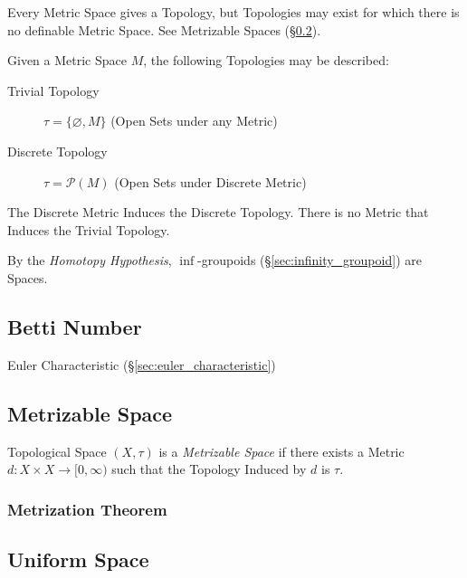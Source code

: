 Every Metric Space gives a Topology, but Topologies may exist for
which there is no definable Metric Space. See Metrizable Spaces
(\S\ref{sec:metrizable_space}).

Given a Metric Space $M$, the following Topologies may be described:
\begin{description}
\item[Trivial Topology] $\tau = \{\varnothing, M\}$ (Open Sets under
  any Metric)

\item[Discrete Topology] $\tau = \mathcal{P}(M)$ (Open Sets under
  Discrete Metric)
\end{description}
The Discrete Metric Induces the Discrete Topology. There is no Metric
that Induces the Trivial Topology.

By the \emph{Homotopy Hypothesis}, $\inf$-groupoids
(\S\ref{sec:infinity_groupoid}) are Spaces.



\subsection{Betti Number}\label{sec:betti_number}

Euler Characteristic (\S\ref{sec:euler_characteristic})



\subsection{Metrizable Space}\label{sec:metrizable_space}

Topological Space $(X, \tau)$ is a \emph{Metrizable Space} if there
exists a Metric $d : X \times X \rightarrow [0, \infty)$ such that the
  Topology Induced by $d$ is $\tau$.



\subsubsection{Metrization Theorem}\label{sec:metrization_theorem}



\subsection{Uniform Space}\label{sec:uniform_space}

